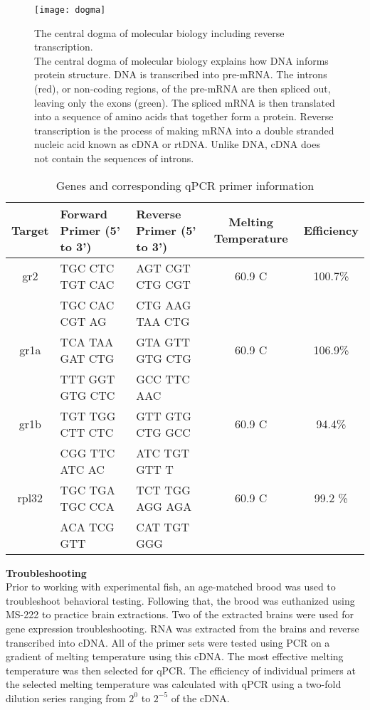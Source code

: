 \documentclass[12pt,twoside]{reedthesis}
\begin{document}
\begin{figure}[htbp] 
\begin{center} 
\texttt{[image: dogma]}
\caption[The central dogma of molecular biology including reverse transcription]{\footnotesize{The
    central dogma of molecular biology including reverse transcription. \\ The
    central dogma of molecular biology explains how DNA informs protein
    structure. DNA is transcribed into pre-mRNA. The introns (red), or non-coding
    regions, of the pre-mRNA are then spliced out, leaving only the exons
    (green). The spliced mRNA is then translated into a sequence of amino acids
    that together form a protein. Reverse transcription is the process of making
  mRNA into a double stranded nucleic acid known as cDNA or rtDNA. Unlike DNA, cDNA
  does not contain the sequences of introns.}} 
\label{dogma}
\end{center} 
\end{figure}

\begin{table}[htbp]
\caption[Genes and corresponding qPCR primer information]{Genes and corresponding
 qPCR primer information}
\begin{center}
\footnotesize
\begin{tabular}{ | c | l | l | c | c |}
\hline
Target & Forward Primer (5' to 3')& Reverse Primer (5' to 3') & Melting Temperature & Efficiency\\
\hline
gr2 & TGC CTC TGT CAC & AGT CGT CTG CGT & 60.9 \textdegree{}C& 100.7\%\\
  &  TGC CAC CGT AG & CTG AAG TAA CTG & & \\
\hline
  gr1a & TCA TAA GAT CTG& GTA GTT GTG CTG & 60.9 \textdegree{}C& 106.9\% \\
  &  TTT GGT GTG CTC &  GCC TTC AAC & & \\
\hline
    gr1b & TGT TGG CTT CTC  & GTT GTG CTG GCC & 60.9 \textdegree{}C& 94.4\%\\
  & CGG TTC ATC AC & ATC TGT GTT T & & \\
\hline
    rpl32 & TGC TGA TGC CCA & TCT TGG AGG AGA & 60.9 \textdegree{}C& 99.2 \%\\
  & ACA TCG GTT & CAT TGT GGG & & \\
\hline
\end{tabular}
\end{center}
\end{table}

\noindent\textbf{Troubleshooting}\\
Prior to working with experimental fish, an age-matched brood was used to
troubleshoot behavioral testing. Following that, the brood was euthanized using
MS-222 to practice brain extractions. Two of the extracted brains were used for
gene expression troubleshooting. RNA was extracted from the brains and reverse
transcribed into cDNA. All of the primer sets were tested using PCR on a gradient of
melting temperature using this cDNA. The most effective melting temperature was
then selected for qPCR. The efficiency of individual primers at the selected
melting temperature was calculated with qPCR using a two-fold dilution series
ranging from $2^0$ to $2^{-5}$ of the cDNA.
\end{document}

